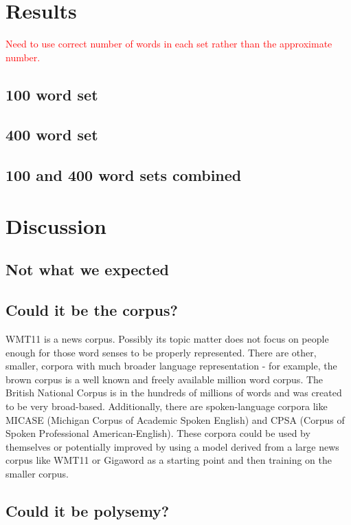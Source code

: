 \documentclass[10pt,letterpaper]{book}
\newcommand{\todo}[1]{\textcolor{red}{#1}}
\begin{document}
\chapter{Results}

\todo{Need to use correct number of words in each set rather than the approximate number.}

\section{100 word set}

\section{400 word set}

\section{100 and 400 word sets combined}

\chapter{Discussion}

\section{Not what we expected}

\section{Could it be the corpus?}

WMT11 is a news corpus. Possibly its topic matter does not focus on people enough for those word senses to be properly represented. There are other, smaller, corpora with much broader language representation - for example, the brown corpus is a well known and freely available million word corpus. The British National Corpus is in the hundreds of millions of words and was created to be very broad-based. Additionally, there are spoken-language corpora like MICASE (Michigan Corpus of Academic Spoken English) and CPSA (Corpus of Spoken Professional American-English). These corpora could be used by themselves or potentially improved by using a model derived from a large news corpus like WMT11 or Gigaword as a starting point and then training on the smaller corpus.

\section{Could it be polysemy?}
\end{document}
